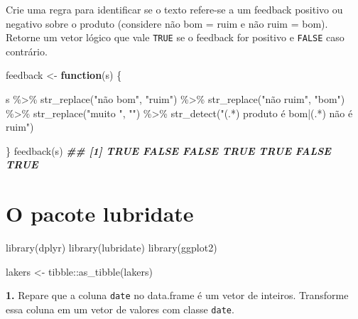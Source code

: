 \documentclass[
]{book}
\newenvironment{Shaded}{\begin{snugshade}}{\end{snugshade}}
\newcommand{\ControlFlowTok}[1]{\textcolor[rgb]{0.13,0.29,0.53}{\textbf{#1}}}
\newcommand{\DocumentationTok}[1]{\textcolor[rgb]{0.56,0.35,0.01}{\textbf{\textit{#1}}}}
\newcommand{\FunctionTok}[1]{\textcolor[rgb]{0.00,0.00,0.00}{#1}}
\newcommand{\NormalTok}[1]{#1}
\newcommand{\OtherTok}[1]{\textcolor[rgb]{0.56,0.35,0.01}{#1}}
\newcommand{\SpecialCharTok}[1]{\textcolor[rgb]{0.00,0.00,0.00}{#1}}
\newcommand{\StringTok}[1]{\textcolor[rgb]{0.31,0.60,0.02}{#1}}
\begin{document}
Crie uma regra para identificar se o texto refere-se a um feedback positivo ou negativo sobre o produto (considere não bom = ruim e não ruim = bom). Retorne um vetor lógico que vale \texttt{TRUE} se o feedback for positivo e \texttt{FALSE} caso contrário.

\begin{Shaded}
\begin{Highlighting}[]
\NormalTok{feedback }\OtherTok{\textless{}{-}} \ControlFlowTok{function}\NormalTok{(s) \{}
  
\NormalTok{  s }\SpecialCharTok{\%\textgreater{}\%} 
    \FunctionTok{str\_replace}\NormalTok{(}\StringTok{"não bom"}\NormalTok{, }\StringTok{"ruim"}\NormalTok{) }\SpecialCharTok{\%\textgreater{}\%}
    \FunctionTok{str\_replace}\NormalTok{(}\StringTok{"não ruim"}\NormalTok{, }\StringTok{"bom"}\NormalTok{) }\SpecialCharTok{\%\textgreater{}\%} 
    \FunctionTok{str\_replace}\NormalTok{(}\StringTok{"muito "}\NormalTok{, }\StringTok{""}\NormalTok{) }\SpecialCharTok{\%\textgreater{}\%} 
    \FunctionTok{str\_detect}\NormalTok{(}\StringTok{"(.*) produto é bom|(.*) não é ruim"}\NormalTok{)}
  
\NormalTok{\}}
\FunctionTok{feedback}\NormalTok{(s)}
\DocumentationTok{\#\# [1]  TRUE FALSE FALSE  TRUE  TRUE FALSE  TRUE}
\end{Highlighting}
\end{Shaded}

\hypertarget{o-pacote-lubridate-1}{%
\section{O pacote lubridate}\label{o-pacote-lubridate-1}}

\begin{Shaded}
\begin{Highlighting}[]
\FunctionTok{library}\NormalTok{(dplyr)}
\FunctionTok{library}\NormalTok{(lubridate)}
\FunctionTok{library}\NormalTok{(ggplot2)}

\NormalTok{lakers }\OtherTok{\textless{}{-}}\NormalTok{ tibble}\SpecialCharTok{::}\FunctionTok{as\_tibble}\NormalTok{(lakers)}
\end{Highlighting}
\end{Shaded}

\textbf{1.} Repare que a coluna \texttt{date} no data.frame é um vetor de inteiros. Transforme essa coluna em um vetor de valores com classe \texttt{date}.
\end{document}
